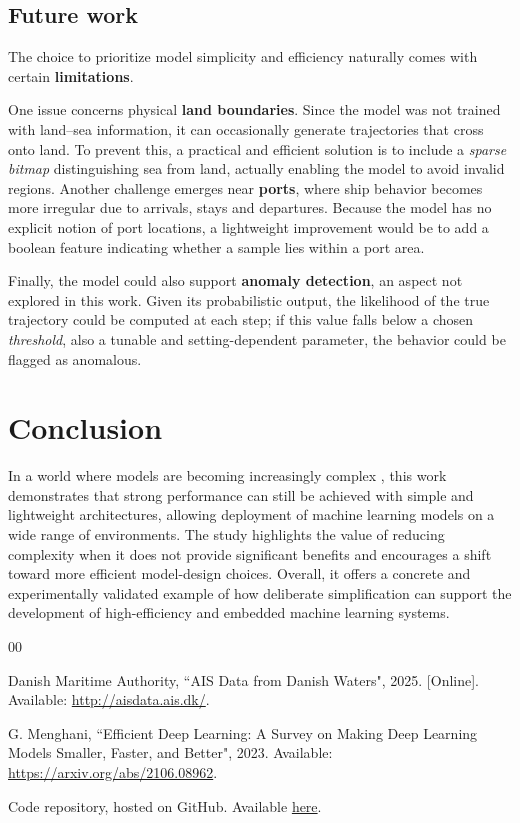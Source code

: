 \documentclass{article}
\begin{document}
\subsection{Future work}
The choice to prioritize model simplicity and efficiency naturally comes with certain \textbf{limitations}.

One issue concerns physical \textbf{land boundaries}. Since the model was not trained with land–sea information, it can occasionally generate trajectories that cross onto land. To prevent this, a practical and efficient solution is to include a \textit{sparse bitmap} distinguishing sea from land, actually enabling the model to avoid invalid regions. Another challenge emerges near \textbf{ports}, where ship behavior becomes more irregular due to arrivals, stays and departures. Because the model has no explicit notion of port locations, a lightweight improvement would be to add a boolean feature indicating whether a sample lies within a port area.

Finally, the model could also support \textbf{anomaly detection}, an aspect not explored in this work. Given its probabilistic output, the likelihood of the true trajectory could be computed at each step; if this value falls below a chosen \textit{threshold}, also a tunable and setting-dependent parameter, the behavior could be flagged as anomalous.

\section{Conclusion}
\label{sec:conclusion}

In a world where models are becoming increasingly complex \cite{b1}, this work demonstrates that strong performance can still be achieved with simple and lightweight architectures, allowing deployment of machine learning models on a wide range of environments. The study highlights the value of reducing complexity when it does not provide significant benefits and encourages a shift toward more efficient model-design choices. Overall, it offers a concrete and experimentally validated example of how deliberate simplification can support the development of high-efficiency and embedded machine learning systems.






\begin{thebibliography}{00}

 Danish Maritime Authority, ``AIS Data from Danish Waters", 2025. [Online]. Available: \url{http://aisdata.ais.dk/}.

 G. Menghani, ``Efficient Deep Learning: A Survey on Making Deep Learning Models Smaller, Faster, and Better", 2023. Available: \url{https://arxiv.org/abs/2106.08962}.

 Code repository, hosted on GitHub. Available \href{https://github.com/andsanv/maritime-trajectory-prediction-in-high-efficiency-settings}{here}.

\end{thebibliography}
\end{document}
